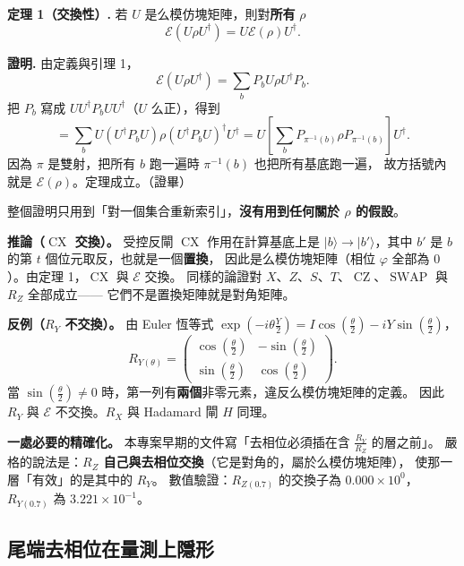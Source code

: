 \documentclass[11pt,a4paper]{ctexart}
\begin{document}
\textbf{定理 1（交換性）.} 若 \(U\) 是么模仿塊矩陣，則對\textbf{所有}
\(\rho\)
\[\mathcal{E}(U\rho U^{\dagger}) = U\mathcal{E}(\rho)U^{\dagger}.\]

\textbf{證明.} 由定義與引理 1，
\[\mathcal{E}(U\rho U^{\dagger}) = \sum_{b}P_{b}U\rho U^{\dagger}P_{b}.\]
把 \(P_{b}\) 寫成 \(UU^{\dagger}P_{b}UU^{\dagger}\)（\(U\) 么正），得到
\[= \sum_{b}U\left( U^{\dagger}P_{b}U \right)\rho\left( U^{\dagger}P_{b}U \right)^{\dagger}U^{\dagger} = U\left\lbrack \sum_{b}P_{\pi^{- 1}(b)}\rho P_{\pi^{- 1}(b)} \right\rbrack U^{\dagger}.\]
因為 \(\pi\) 是雙射，把所有 \(b\) 跑一遍時 \(\pi^{- 1}(b)\)
也把所有基底跑一遍， 故方括號內就是
\(\mathcal{E}(\rho)\)。定理成立。（證畢）

整個證明只用到「對一個集合重新索引」，\textbf{沒有用到任何關於 \(\rho\)
的假設}。

\textbf{推論（\(\operatorname{CX}\) 交換）。} 受控反閘
\(\operatorname{CX}\) 作用在計算基底上是
\(|b\rangle \rightarrow |b'\rangle\)，其中 \(b'\) 是 \(b\) 的第 \(t\)
個位元取反，也就是一個\textbf{置換}， 因此是么模仿塊矩陣（相位
\(\varphi\) 全部為 \(0\)）。由定理 1，\(\operatorname{CX}\) 與
\(\mathcal{E}\) 交換。 同樣的論證對
\(X\)、\(Z\)、\(S\)、\(T\)、\(\operatorname{CZ}\)、\(\operatorname{SWAP}\)
與 \(R_{Z}\) 全部成立------ 它們不是置換矩陣就是對角矩陣。

\textbf{反例（\(R_{Y}\) 不交換）。} 由 Euler 恆等式
\(\exp( - i\theta\frac{Y}{2}) = I\cos(\frac{\theta}{2}) - iY\sin(\frac{\theta}{2})\)，
\[R_{Y(\theta)} = \begin{pmatrix}
\cos(\frac{\theta}{2}) & - \sin(\frac{\theta}{2}) \\
\sin(\frac{\theta}{2}) & \cos(\frac{\theta}{2})
\end{pmatrix}.\] 當 \(\sin(\frac{\theta}{2}) \neq 0\)
時，第一列有\textbf{兩個}非零元素，違反么模仿塊矩陣的定義。 因此
\(R_{Y}\) 與 \(\mathcal{E}\) 不交換。\(R_{X}\) 與 Hadamard 閘 \(H\)
同理。

\textbf{一處必要的精確化。} 本專案早期的文件寫「去相位必須插在含
\(\frac{R_{Y}}{R_{Z}}\) 的層之前」。 嚴格的說法是：\textbf{\(R_{Z}\)
自己與去相位交換}（它是對角的，屬於么模仿塊矩陣），
使那一層「有效」的是其中的 \(R_{Y}\)。 數值驗證：\(R_{Z(0.7)}\)
的交換子為 \(0.000 \times 10^{0}\)，\(R_{Y(0.7)}\) 為
\(3.221 \times 10^{- 1}\)。

\subsection{尾端去相位在量測上隱形}
\end{document}
